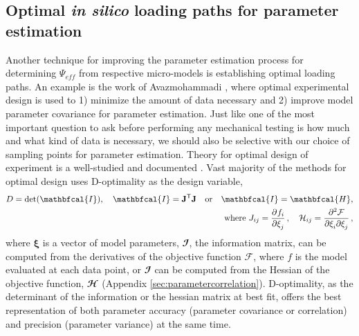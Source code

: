 \subsection{Optimal \textit{in silico} loading paths for parameter estimation}\label{sec:optimaldesign}

	Another technique for improving the parameter estimation process for determining $\Psi_{eff}$ from respective micro-models is establishing optimal loading paths. An example is the work of Avazmohammadi \cite{Avazmohammadi2017b}, where optimal experimental design is used to 1) minimize the amount of data necessary and 2) improve model parameter covariance for parameter estimation. Just like one of the most important question to ask before performing any mechanical testing is how much and what kind of data is necessary, we should also be selective with our choice of sampling points for parameter estimation. Theory for optimal design of experiment is a well-studied and documented \cite{lanir_optimal_1996, zhu_d_2014}. Vast majority of the methods for optimal design uses D-optimality as the design variable,
\begin{equation}\label{eqn:doptimality}
\begin{aligned}
D = \det(\mathbfcal{I}), \quad \mathbfcal{I} = \mathbf{J}^\mathsf{T}\mathbf{J} \quad \mathrm{or} \quad \mathbfcal{I} = \mathbfcal{H},	\\
\mathrm{where} \ J_{ij} = \dpd{f_i}{\xi_j}, \quad \mathcal{H}_{ij} = \dmd{\mathcal{F}}{2}{\xi_i}{}{\xi_j}{},
\end{aligned}
\end{equation}
where $\mathbf{\xi}$ is a vector of model parameters, $\mathbfcal{I}$, the information matrix, can be computed from the derivatives of the objective function $\mathcal{F}$, where $f$ is the model evaluated at each data point, or $\mathbfcal{I}$ can be computed from the Hessian of the objective function, $\mathbfcal{H}$ (Appendix \ref{sec:parametercorrelation}). D-optimality, as the determinant of the information or the hessian matrix at best fit, offers the best representation of both parameter accuracy (parameter covariance or correlation) and precision (parameter variance) at the same time.

